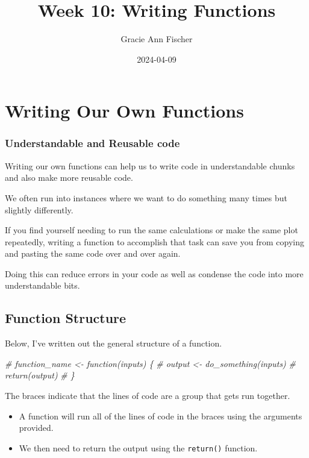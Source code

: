 \documentclass[
]{article}
\title{Week 10: Writing Functions}
\author{Gracie Ann Fischer}
\date{2024-04-09}
\newenvironment{Shaded}{\begin{snugshade}}{\end{snugshade}}
\newcommand{\CommentTok}[1]{\textcolor[rgb]{0.56,0.35,0.01}{\textit{#1}}}
\providecommand{\tightlist}{%
  \setlength{\itemsep}{0pt}\setlength{\parskip}{0pt}}
\begin{document}
\maketitle

\hypertarget{writing-our-own-functions}{%
\section{Writing Our Own Functions}\label{writing-our-own-functions}}

\hypertarget{understandable-and-reusable-code}{%
\subsubsection{Understandable and Reusable
code}\label{understandable-and-reusable-code}}

Writing our own functions can help us to write code in understandable
chunks and also make more reusable code.

We often run into instances where we want to do something many times but
slightly differently.

If you find yourself needing to run the same calculations or make the
same plot repeatedly, writing a function to accomplish that task can
save you from copying and pasting the same code over and over again.

Doing this can reduce errors in your code as well as condense the code
into more understandable bits.

\hypertarget{function-structure}{%
\subsection{Function Structure}\label{function-structure}}

Below, I've written out the general structure of a function.

\begin{Shaded}
\begin{Highlighting}[]
\CommentTok{\# function\_name \textless{}{-} function(inputs) \{}
\CommentTok{\#   output \textless{}{-} do\_something(inputs)}
\CommentTok{\#   return(output)}
\CommentTok{\# \}}
\end{Highlighting}
\end{Shaded}

The braces indicate that the lines of code are a group that gets run
together.

\begin{itemize}
\tightlist
\item
  A function will run all of the lines of code in the braces using the
  arguments provided.
\item
  We then need to return the output using the \texttt{return()}
  function.
\end{itemize}
\end{document}
